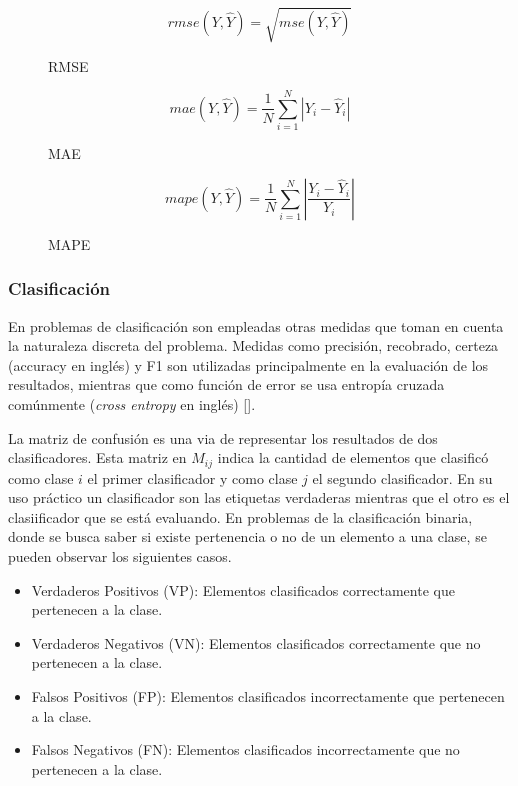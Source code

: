 \begin{figure}
	\begin{equation}\label{metric:RMSE}
		rmse(Y, \hat{Y}) = \sqrt{mse(Y, \hat{Y})}
	\end{equation}
	\caption{RMSE}
\end{figure}

\begin{figure}
	\begin{equation}\label{metric:MAE}
		mae(Y, \hat{Y}) = \frac{1}{N} \sum^{N}_{i=1} |Y_i - \hat{Y}_i|
	\end{equation}
	\caption{MAE}
\end{figure}

\begin{figure}
	\begin{equation}\label{metric:MAPE}
		mape(Y, \hat{Y}) = \frac{1}{N} \sum^{N}_{i=1} |\frac{Y_i - \hat{Y}_i}{Y_i}|
	\end{equation}
	\caption{MAPE}
\end{figure}

\subsubsection{Clasificación}

En problemas de clasificación son empleadas otras medidas que toman en cuenta la naturaleza discreta del problema. 
Medidas como precisión, recobrado, certeza (accuracy en inglés) y F1 son utilizadas principalmente en la 
evaluación de los resultados, mientras que como función de error se usa entropía cruzada comúnmente 
(\emph{cross entropy} en inglés) [\cite{grandini2020metrics}].

La matriz de confusión es una via de representar los resultados de dos clasificadores. Esta matriz en $M_{ij}$ 
indica la cantidad de elementos que clasificó como clase $i$ el primer clasificador y
como clase $j$ el segundo clasificador. En su uso práctico
un clasificador son las etiquetas verdaderas mientras que el otro es el clasiificador que se está evaluando. 
En problemas de la clasificación binaria, donde se busca saber si existe pertenencia o no de un elemento a una clase,
se pueden observar los siguientes casos.

\begin{itemize}
	\item Verdaderos Positivos (VP): Elementos clasificados correctamente que pertenecen a la clase.
	\item Verdaderos Negativos (VN): Elementos clasificados correctamente que no pertenecen a la clase.
	\item Falsos Positivos (FP): Elementos clasificados incorrectamente que pertenecen a la clase.
	\item Falsos Negativos (FN): Elementos clasificados incorrectamente que no pertenecen a la clase.
\end{itemize}

